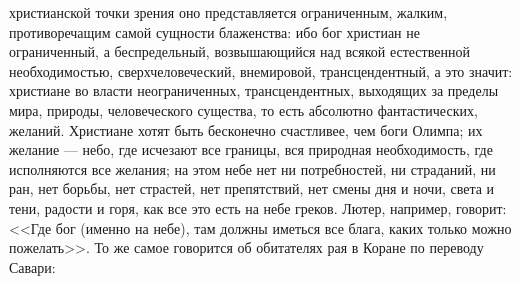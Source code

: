 \documentclass[12pt]{article}
\begin{document}
христианской точки зрения оно представляется ограниченным, жалким, противоречащим самой сущности блаженства: ибо бог христиан не ограниченный, а беспредельный, возвышающийся над всякой естественной необходимостью, сверхчеловеческий, внемировой, трансцендентный, а это значит: христиане во власти неограниченных, трансцендентных, выходящих за пределы мира, природы, человеческого существа, то есть абсолютно фантастических, желаний. Христиане хотят быть бесконечно счастливее, чем боги Олимпа; их желание --- небо, где исчезают все границы, вся природная необходимость, где исполняются все желания; на этом небе нет ни потребностей, ни страданий, ни ран, нет борьбы, нет страстей, нет препятствий, нет смены дня и ночи, света и тени, радости и горя, как все это есть на небе греков. Лютер, например, говорит: <<Где бог (именно на небе), там должны иметься все блага, каких только можно пожелать>>. То же самое говорится об обитателях рая в Коране по переводу Савари:
\end{document}

